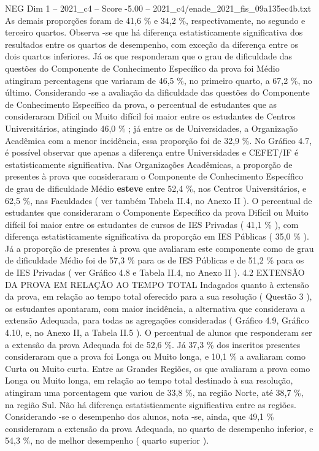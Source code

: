 \begin{textsample}{NEG Dim 1 – 2021\_c4 – Score -5.00 – 2021\_c4/enade\_2021\_fis\_09a135ec4b.txt}
As demais proporções foram de 41,6 \% e 34,2 \%, respectivamente, no segundo e terceiro quartos.
Observa -se que há diferença estatisticamente significativa dos resultados entre os quartos de desempenho, com exceção da diferença entre os dois quartos inferiores.
Já os que responderam que o grau de dificuldade das questões do Componente de Conhecimento Específico da prova foi Médio atingiram percentagens que variaram de 46,5 \%, no primeiro quarto, a 67,2 \%, no último.
Considerando -se a avaliação da dificuldade das questões do Componente de Conhecimento Específico da prova, o percentual de estudantes que as consideraram Difícil ou Muito difícil foi maior entre os estudantes de Centros Universitários, atingindo 46,0 \% ; já entre os de Universidades, a Organização Acadêmica com a menor incidência, essa proporção foi de 32,9 \%.
No Gráfico 4.7, é possível observar que apenas a diferença entre Universidades e CEFET/IF é estatisticamente significativa.
Nas Organizações Acadêmicas, a proporção de presentes à prova que consideraram o Componente de Conhecimento Específico de grau de dificuldade Médio \textbf{esteve} entre 52,4 \%, nos Centros Universitários, e 62,5 \%, nas Faculdades ( ver também Tabela II.4, no Anexo II ).
O percentual de estudantes que consideraram o Componente Específico da prova Difícil ou Muito difícil foi maior entre os estudantes de cursos de IES Privadas ( 41,1 \% ), com diferença estatisticamente significativa da proporção em IES Públicas ( 35,0 \% ).
Já a proporção de presentes à prova que avaliaram este componente como de grau de dificuldade Médio foi de 57,3 \% para os de IES Públicas e de 51,2 \% para os de IES Privadas ( ver Gráfico 4.8 e Tabela II.4, no Anexo II ). 4.2 EXTENSÃO DA PROVA EM RELAÇÃO AO TEMPO TOTAL Indagados quanto à extensão da prova, em relação ao tempo total oferecido para a sua resolução ( Questão 3 ), os estudantes apontaram, com maior incidência, a alternativa que considerava a extensão Adequada, para todas as agregações consideradas ( Gráfico 4.9, Gráfico 4.10, e, no Anexo II, a Tabela II.5 ).
O percentual de alunos que responderam ser a extensão da prova Adequada foi de 52,6 \%.
Já 37,3 \% dos inscritos presentes consideraram que a prova foi Longa ou Muito longa, e 10,1 \% a avaliaram como Curta ou Muito curta.
Entre as Grandes Regiões, os que avaliaram a prova como Longa ou Muito longa, em relação ao tempo total destinado à sua resolução, atingiram uma porcentagem que variou de 33,8 \%, na região Norte, até 38,7 \%, na região Sul.
Não há diferença estatisticamente significativa entre as regiões.
Considerando -se o desempenho dos alunos, nota -se, ainda, que 49,1 \% consideraram a extensão da prova Adequada, no quarto de desempenho inferior, e 54,3 \%, no de melhor desempenho ( quarto superior ).

\end{textsample}
